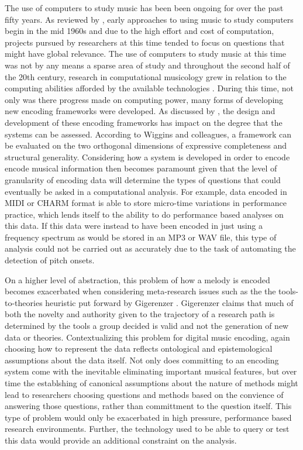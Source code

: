 \documentclass[]{book}
\begin{document}
The use of computers to study music has been been ongoing for over the past fifty years.
As reviewed by \citet{hewlettComputingMusicology1991}, early approaches to using music to study computers begin in the mid 1960s and due to the high effort and cost of computation, projects pursued by researchers at this time tended to focus on questions that might have global relevance.
The use of computers to study music at this time was not by any means a sparse area of study and throughout the second half of the 20th century, research in computational musicology grew in relation to the computing abilities afforded by the available technologies \citep{nettheimBibliographyStatisticalApplications1997}.
During this time, not only was there progress made on computing power, many forms of developing new encoding frameworks were developed.
As discussed by \citet{wigginsFrameworkEvaluationMusic1993}, the design and development of these encoding frameworks has impact on the degree that the systems can be assessed.
According to Wiggins and colleagues, a framework can be evaluated on the two orthogonal dimensions of expressive completeness and structural generality.
Considering how a system is developed in order to encode encode musical information then becomes paramount given that the level of granularity of encoding data will determine the types of questions that could eventually be asked in a computational analysis.
For example, data encoded in MIDI or CHARM format is able to store micro-time variations in performance practice, which lends itself to the ability to do performance based analyses on this data.
If this data were instead to have been encoded in just using a frequency spectrum as would be stored in an MP3 or WAV file, this type of analysis could not be carried out as accurately due to the task of automating the detection of pitch onsets.

On a higher level of abstraction, this problem of how a melody is encoded becomes exacerbated when considering meta-research issues such as the the tools-to-theories heuristic put forward by Gigerenzer \citep{gigerenzerToolsTheoriesHeuristic1991}.
Gigerenzer claims that much of both the novelty and authority given to the trajectory of a research path is determined by the tools a group decided is valid and not the generation of new data or theories.
Contextualizing this problem for digital music encoding, again choosing how to represent the data reflects ontological and epistemological assumptions about the data itself.
Not only does committing to an encoding system come with the inevitable eliminating important musical features, but over time the establshing of canonical assumptions about the nature of methods might lead to researchers choosing questions and methods based on the convience of answering those questions, rather than committment to the question itself.
This type of problem would only be exacerbated in high pressure, performance based research environments.
Further, the technology used to be able to query or test this data would provide an additional constraint on the analysis.
\end{document}
